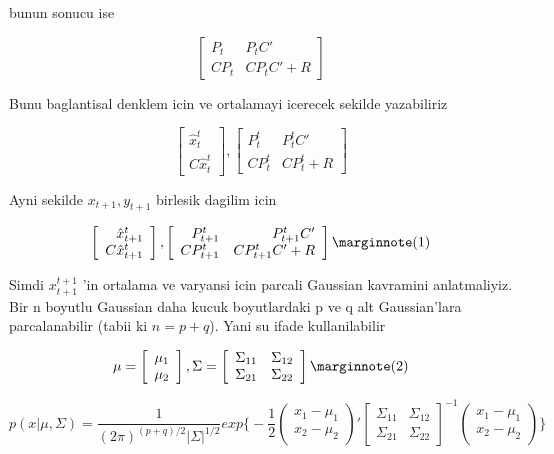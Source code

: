 \documentclass[12pt,fleqn]{article}\usepackage{../common}
\begin{document}
bunun sonucu ise

\[ 
\left[\begin{array}{rr}
P_t & P_t C' \\
CP_t & CP_tC' + R
\end{array}\right]
 \]

Bunu baglantisal denklem icin ve ortalamayi icerecek sekilde yazabiliriz

\[ 
\left[\begin{array}{r}
\hat{x}_t^t \\
C\hat{x}_t^t
\end{array}\right] 
, 
\left[\begin{array}{rr}
P_t^t & P_t^tC' \\
CP_t^t & CP_t^t + R
\end{array}\right]
 \]

Ayni sekilde $x_{t+1} , y_{t+1}$ birlesik dagilim icin

\[
\left[\begin{array}{r}
\hat{x}_{t+1}^t \\
C\hat{x}_{t+1}^t
\end{array}\right], 
\left[\begin{array}{rr}
P_{t+1}^t & P_{t+1}^tC' \\
CP_{t+1}^t & CP_{t+1}^tC' + R
\end{array}\right] 
\mlabel{1}
\]

Simdi $x_{t+1}^{t+1}$ 'in ortalama ve varyansi icin parcali Gaussian kavramini
anlatmaliyiz. Bir n boyutlu Gaussian daha kucuk boyutlardaki p ve q alt
Gaussian'lara parcalanabilir (tabii ki $n = p + q$). Yani su ifade
kullanilabilir

\[
\mu = 
\left[\begin{array}{r}
\mu_1 \\ \mu_2
\end{array}\right], 
\Sigma = 
\left[\begin{array}{rr}
\Sigma_{11} & \Sigma_{12} \\
\Sigma_{21} & \Sigma_{22} 
\end{array}\right]
\mlabel{2}
\]

\[ 
p(x|\mu,\Sigma) = 
\frac{1}{(2\pi)^{(p+q)/2}|\Sigma|^{1/2}}
exp \bigg\{ 
-\frac{1}{2} 
\left(\begin{array}{rr}
x_1 - \mu_1 \\
x_2 - \mu_2 
\end{array}\right)'
\left[\begin{array}{rr}
\Sigma_{11} & \Sigma_{12} \\
\Sigma_{21} & \Sigma_{22} 
\end{array}\right]^{-1}
\left(\begin{array}{rr}
x_1 - \mu_1 \\
x_2 - \mu_2 
\end{array}\right)
\bigg\}
 \]
\end{document}
